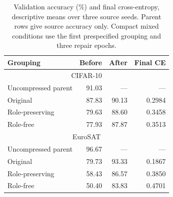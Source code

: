 \begin{table}[t]
\centering\footnotesize
\caption{Validation accuracy (\%) and final cross-entropy, descriptive means over three source seeds. Parent rows give source accuracy only. Compact mixed conditions use the first prespecified grouping and three repair epochs.}
\label{tab:accuracy}
\begin{tabular}{lrrr}
\toprule
Grouping & Before & After & Final CE \\
\midrule
\multicolumn{4}{c}{CIFAR-10} \\
Uncompressed parent & 91.03 & --- & --- \\
Original & 87.83 & 90.13 & 0.2984 \\
Role-preserving & 79.63 & 88.60 & 0.3458 \\
Role-free & 77.93 & 87.87 & 0.3513 \\
\multicolumn{4}{c}{EuroSAT} \\
Uncompressed parent & 96.67 & --- & --- \\
Original & 79.73 & 93.33 & 0.1867 \\
Role-preserving & 58.43 & 86.57 & 0.3850 \\
Role-free & 50.40 & 83.83 & 0.4701 \\
\bottomrule
\end{tabular}
\end{table}

